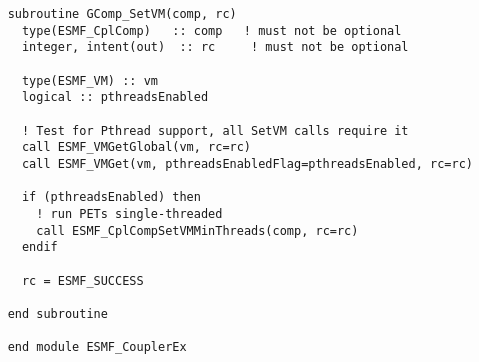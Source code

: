  \begin{verbatim}
    subroutine GComp_SetVM(comp, rc)
      type(ESMF_CplComp)   :: comp   ! must not be optional
      integer, intent(out)  :: rc     ! must not be optional
      
      type(ESMF_VM) :: vm
      logical :: pthreadsEnabled
      
      ! Test for Pthread support, all SetVM calls require it
      call ESMF_VMGetGlobal(vm, rc=rc)
      call ESMF_VMGet(vm, pthreadsEnabledFlag=pthreadsEnabled, rc=rc)

      if (pthreadsEnabled) then
        ! run PETs single-threaded
        call ESMF_CplCompSetVMMinThreads(comp, rc=rc)
      endif

      rc = ESMF_SUCCESS

    end subroutine

    end module ESMF_CouplerEx
 
\end{verbatim}

\setlength{\parskip}{\oldparskip}
\setlength{\parindent}{\oldparindent}
\setlength{\baselineskip}{\oldbaselineskip}
